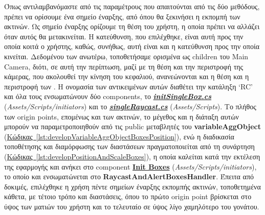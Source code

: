 Όπως αντιλαμβανόμαστε από τις παραμέτρους που απαιτούνται από τις δύο μεθόδους, πρέπει να ορίσουμε ένα σημείο έναρξης, από όπου θα ξεκινήσει η εκπομπή των ακτινών. Ως σημείο έναρξης ορίζουμε τη θέση του χρήστη, η οποία πρέπει να αλλάζει όταν αυτός θα μετακινείται. Η κατεύθυνση, που επιλέχθηκε, είναι αυτή προς την οποία κοιτά ο χρήστης, καθώς, συνήθως, αυτή είναι και η κατεύθυνση προς την οποία κινείται. Δεδομένου των ανωτέρω, τοποθετήσαμε ορισμένα  ως children του  Main Camera, διότι, σε αυτή την περίπτωση, μαζί με τη θέση και την περιστροφή της κάμερας, που ακολουθεί την κίνηση του κεφαλιού, ανανεώνονται και η θέση και η περιστροφή των . Η ονομασία των αντικειμένων αυτών διαθέτει την κατάληξη `RC' και όλα τους ενσωματώνουν δύο components, το \hyperref[lst:initSingleBox]{\textbf{\textit{initSingleBox.cs}}} (\textit{Assets/Scripts/initiators}) και το \hyperref[lst:singleRaycast]{\textbf{\textit{singleRaycast.cs}}} (\textit{Assets/Scripts}). Το πλήθος των origin points, επομένως και των ακτινών, το μέγεθος και η διάταξη αυτών μπορούν να παραμετροποιηθούν από τις public μεταβλητές του \textbf{variableAggObject} (\hyperref[lst:developVariableAggObjectBoxesPosition]{Κώδικας~\ref*{lst:developVariableAggObjectBoxesPosition}}), ενώ η διαδικασία τοποθέτησης και διαμόρφωσης των διαστάσεων πραγματοποιείται από τη συνάρτηση  (\hyperref[lst:developPositionAndScaleBoxes]{Κώδικας~\ref*{lst:developPositionAndScaleBoxes}}), η οποία καλείται κατά την εκτέλεση της εφαρμογής και ανήκει στο component \hyperref[lst:initBoxes]{\textbf{Init Boxes}} (\textit{Assets/Scripts/initiators}), το οποίο και ενσωματώνεται στο  \textbf{RaycastAndAlertBoxesHandler}. Έπειτα από δοκιμές, επιλέχθηκε η χρήση πέντε σημείων έναρξης εκπομπής ακτινών, τοποθετημένα κάθετα, με τέτοιο τρόπο και διαστάσεις, όπου το πρώτο origin point βρίσκεται στο ύψος των ματιών του χρήστη και το τελευταίο σε ύψος λίγο χαμηλότερο του γονάτου.



